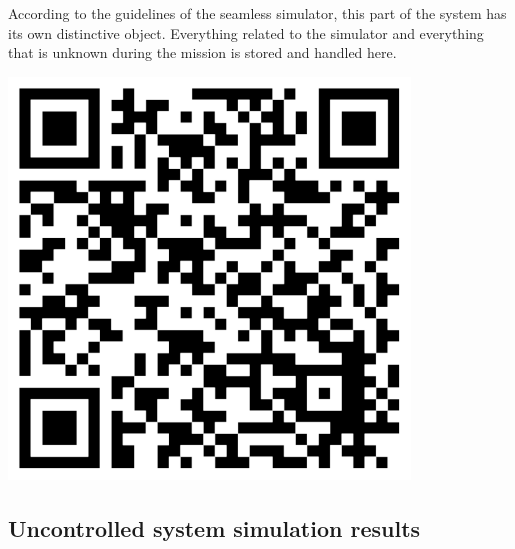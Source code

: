 \begin{tcolorbox}[colback=cyan!5,colframe=cyan!40!black,title=Code: Simulator.py \\ https://www.dropbox.com/s/agron9anslev6xw/Simulator.py]
\begin{minipage}{0,6\textwidth}
According to the guidelines of the seamless simulator, this part of the system has its own distinctive object. Everything related to the simulator and everything that is unknown during the mission is stored and handled here.
\end{minipage}
\begin{minipage}{0,35\textwidth}
\raggedleft
\includegraphics[width=0.8\textwidth]{img/simulatorcode}
\end{minipage}
\end{tcolorbox}

\subsection{Uncontrolled system simulation results}